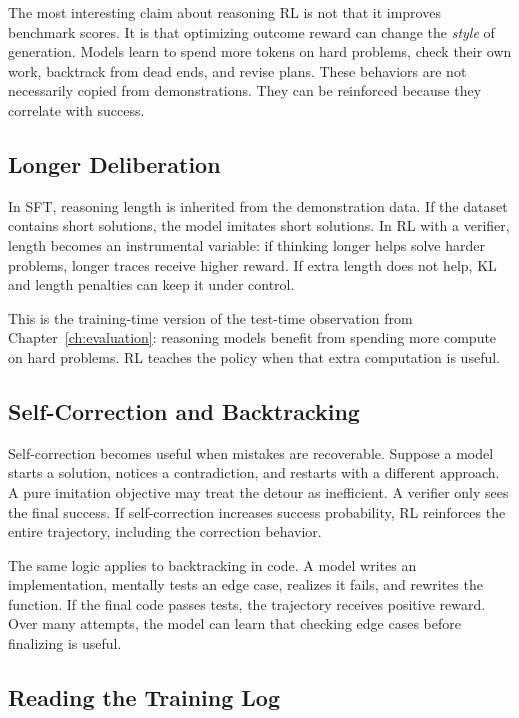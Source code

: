 The most interesting claim about reasoning RL is not that it improves benchmark scores. It is that optimizing outcome reward can change the \emph{style} of generation. Models learn to spend more tokens on hard problems, check their own work, backtrack from dead ends, and revise plans. These behaviors are not necessarily copied from demonstrations. They can be reinforced because they correlate with success.

\subsection{Longer Deliberation}

In SFT, reasoning length is inherited from the demonstration data. If the dataset contains short solutions, the model imitates short solutions. In RL with a verifier, length becomes an instrumental variable: if thinking longer helps solve harder problems, longer traces receive higher reward. If extra length does not help, KL and length penalties can keep it under control.

This is the training-time version of the test-time observation from Chapter~\ref{ch:evaluation}: reasoning models benefit from spending more compute on hard problems. RL teaches the policy when that extra computation is useful.

\subsection{Self-Correction and Backtracking}

Self-correction becomes useful when mistakes are recoverable. Suppose a model starts a solution, notices a contradiction, and restarts with a different approach. A pure imitation objective may treat the detour as inefficient. A verifier only sees the final success. If self-correction increases success probability, RL reinforces the entire trajectory, including the correction behavior.

The same logic applies to backtracking in code. A model writes an implementation, mentally tests an edge case, realizes it fails, and rewrites the function. If the final code passes tests, the trajectory receives positive reward. Over many attempts, the model can learn that checking edge cases before finalizing is useful.

\subsection{Reading the Training Log}

